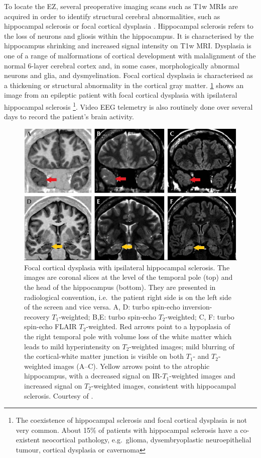 To locate the \ac{EZ}, several preoperative imaging scans such as \ac{T1w} \acp{MRI} are acquired in order to identify structural cerebral abnormalities, such as hippocampal sclerosis \cite{thom_review_2014} or focal cortical dysplasia \cite{kabat_focal_2012}.
Hippocampal sclerosis refers to the loss of neurons and gliosis within the hippocampus.
It is characterised by the hippocampus shrinking and increased signal intensity on \ac{T1w} \ac{MRI}.
Dysplasia is one of a range of malformations of cortical development with malalignment of the normal 6-layer cerebral cortex and, in some cases, morphologically abnormal neurons and glia, and dysmyelination.
Focal cortical dysplasia is characterised as a thickening or structural abnormality in the cortical gray matter.
\cref{fig:lesions} shows an image from an epileptic patient with focal cortical dysplasia with ipsilateral hippocampal sclerosis%
\footnote{The coexistence of hippocampal sclerosis and focal cortical dysplasia is not very common.
About 15\% of patients with hippocampal sclerosis have a co-existent neocortical pathology, e.g.\ glioma, dysembryoplastic neuroepithelial tumour, cortical dysplasia or cavernoma}.
Video \ac{EEG} telemetry is also routinely done over several days to record the patient's brain activity.

\begin{figure}
  \centering
  \includegraphics[width=\linewidth]{figures/lesions_arrows}
  \caption[Focal cortical dysplasia with ipsilateral hippocampal sclerosis]{
    Focal cortical dysplasia with ipsilateral hippocampal sclerosis.
    The images are coronal slices at the level of the temporal pole (top) and the head of the hippocampus (bottom).
    They are presented in radiological convention, i.e.\ the patient right side is on the left side of the screen and vice versa. A, D: turbo spin-echo inversion-recovery $T_1$-weighted; B,E: turbo spin-echo $T_2$-weighted; C, F: turbo spin-echo FLAIR $T_2$-weighted.
    Red arrows point to a hypoplasia of the right temporal pole with volume loss of the white matter which leads to mild hyperintensity on $T_2$-weighted images; mild blurring of the cortical-white matter junction is visible on both $T_1$- and $T_2$-weighted images (A–C).
    Yellow arrows point to the atrophic hippocampus, with a decreased signal on IR-$T_1$-weighted images and increased signal on $T_2$-weighted images, consistent with hippocampal sclerosis.
    Courtesy of \cite{colombo_imaging_2009}.
  }
  \label{fig:lesions}
\end{figure}
